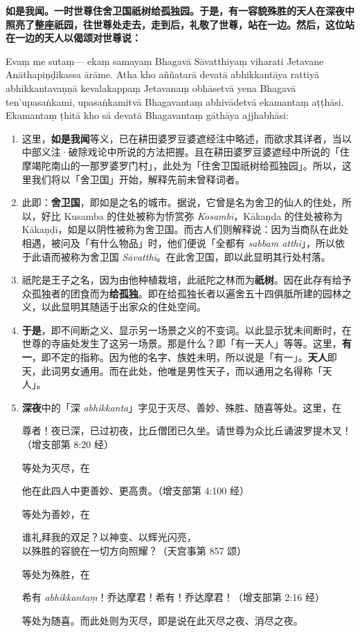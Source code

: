 \textbf{如是我闻。一时世尊住舍卫国祇树给孤独园。于是，有一容貌殊胜的天人在深夜中照亮了整座祇园，往世尊处走去，走到后，礼敬了世尊，站在一边。然后，这位站在一边的天人以偈颂对世尊说：}

Evaṃ me sutaṃ— ekaṃ samayaṃ Bhagavā Sāvatthiyaṃ viharati Jetavane Anāthapiṇḍikassa ārāme. Atha kho aññatarā devatā abhikkantāya rattiyā abhikkantavaṇṇā kevalakappaṃ Jetavanaṃ obhāsetvā yena Bhagavā ten’upasaṅkami, upasaṅkamitvā Bhagavantaṃ abhivādetvā ekamantaṃ aṭṭhāsi. Ekamantaṃ ṭhitā kho sā devatā Bhagavantaṃ gāthāya ajjhabhāsi:

\begin{enumerate}\item 这里，\textbf{如是我闻}等义，已在耕田婆罗豆婆遮经注中略述，而欲求其详者，当以中部义注·破除戏论中所说的方法把握。且在耕田婆罗豆婆遮经中所说的「住摩竭陀南山的一那罗婆罗门村」，此处为「住舍卫国祇树给孤独园」。所以，这里我们将以「舍卫国」开始，解释先前未曾释词者。
\item 此即：\textbf{舍卫国}，即如是之名的城市。据说，它曾是名为舍卫的仙人的住处，所以，好比 Kusamba 的住处被称为㤭赏弥 \textit{Kosambī}，Kākaṇḍa 的住处被称为 Kākaṇḍī，如是以阴性被称为舍卫国。而古人们则解释说：因为当商队在此处相遇，被问及「有什么物品」时，他们便说「全都有 \textit{sabbam atthi}」，所以依于此语而被称为舍卫国 \textit{Sāvatthī}。在此舍卫国，即以此显明其行处村落。
\item 祇陀是王子之名，因为由他种植栽培，此祇陀之林而为\textbf{祇树}。因在此存有给予众孤独者的团食而为\textbf{给孤独}。即在给孤独长者以遍舍五十四俱胝所建的园林之义，以此显明其随适于出家众的住处空间。
\item \textbf{于是}，即不间断之义、显示另一场景之义的不变词。以此显示犹未间断时，在世尊的寺庙处发生了这另一场景。那是什么？即「有一天人」等等。这里，\textbf{有一}，即不定的指称。因为他的名字、族姓未明，所以说是「有一」。\textbf{天人}即天，此词男女通用。而在此处，他唯是男性天子，而以通用之名得称「天人」。
\item \textbf{深夜}中的「深 \textit{abhikkanta}」字见于灭尽、善妙、殊胜、随喜等处。这里，在\begin{quoting}尊者！夜已深，已过初夜，比丘僧团已久坐。请世尊为众比丘诵波罗提木叉！（增支部第 8:20 经）\end{quoting}等处为灭尽，在\begin{quoting}他在此四人中更善妙、更高贵。（增支部第 4:100 经）\end{quoting}等处为善妙，在\begin{quoting}谁礼拜我的双足？以神变、以辉光闪亮，\\以殊胜的容貌在一切方向照耀？（天宫事第 857 颂）\end{quoting}等处为殊胜，在\begin{quoting}希有 \textit{abhikkantaṃ}！乔达摩君！希有！乔达摩君！（增支部第 2:16 经）\end{quoting}等处为随喜。而此处则为灭尽，即是说在此灭尽之夜、消尽之夜。

\end{enumerate}
